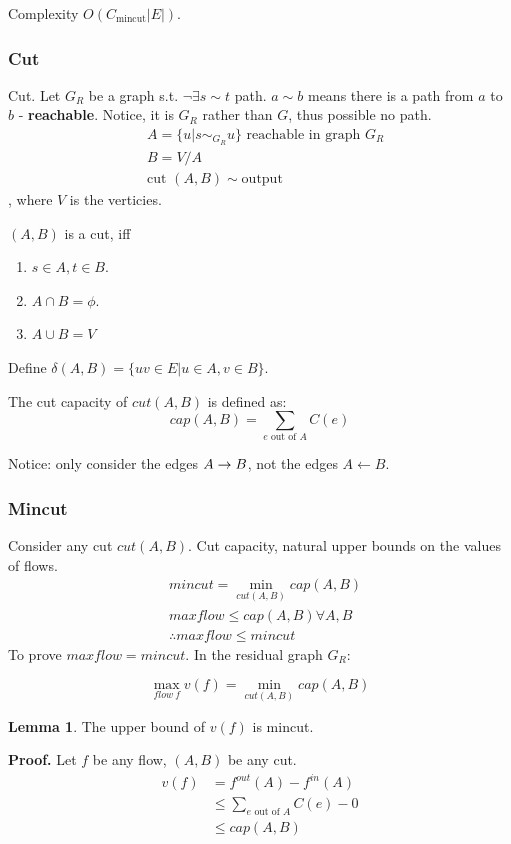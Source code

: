 \documentclass[a4paper]{report}
\theoremstyle{definition}
\newtheorem{lem}{Lemma}[section]
\begin{document}
Complexity $O(C_{\text{mincut}}|E|)$.
\subsubsection{Cut}
Cut. Let $G_R$ be a graph s.t. $\neg \exists s \sim t$ path. $a \sim b$ means there is a path from $a$ to $b$ - \textbf{reachable}. Notice, it is $G_R$ rather than $G$, thus possible no path.
\begin{align*}
& A = \{u| s\sim_{G_R} u\} \text{ reachable in graph $G_R$}\\
& B = V/A\\
& \text{cut } (A, B) \sim \text{output}
\end{align*}
, where $V$ is the verticies.

$(A, B)$ is a cut, iff
\begin{enumerate}
\item $s\in A, t\in B$.
\item $A\cap B = \phi$.
\item $A\cup B = V$
\end{enumerate}
Define $\delta(A,B)=\{uv\in E| u\in A, v\in B\}$.

The cut capacity of $cut(A,B)$ is defined as:
$$
cap(A, B) = \sum_{e \text{ out of }A}C(e)
$$

Notice: only consider the edges $A\rightarrow B$, not the edges $A \leftarrow B$.

\subsubsection{Mincut}
Consider any cut $cut(A,B)$. Cut capacity, natural upper bounds on the values of flows.
\begin{align*}
& mincut = \min_{cut(A,B)} cap(A, B)\\
& maxflow \leq cap(A, B) \forall A, B \\
& \therefore maxflow \leq mincut
\end{align*}
To prove $maxflow = mincut$. In the residual graph $G_R$:

$$
\max_{flow~f} v(f) = \min_{cut(A, B)} cap(A,B)
$$

\begin{lem}
The upper bound of $v(f)$ is mincut.
\end{lem}

\textbf{Proof.} Let $f$ be any flow, $(A,B)$ be any cut.
\begin{align*}
v(f) &= f^{out}(A)-f^{in}(A) \\
&\leq \sum_{e \text{ out of }A}C(e) - 0\\
&\leq cap(A, B) \\
\end{align*}
\end{document}

